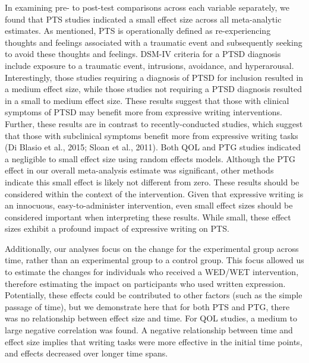 \documentclass[man, mask]{apa6}
\theoremstyle{definition}
\theoremstyle{definition}
\theoremstyle{definition}
\theoremstyle{remark}
\begin{document}
In examining pre- to post-test comparisons across each variable
separately, we found that PTS studies indicated a small effect size
across all meta-analytic estimates. As mentioned, PTS is operationally
defined as re-experiencing thoughts and feelings associated with a
traumatic event and subsequently seeking to avoid these thoughts and
feelings. DSM-IV criteria for a PTSD diagnosis include exposure to a
traumatic event, intrusions, avoidance, and hyperarousal. Interestingly,
those studies requiring a diagnosis of PTSD for inclusion resulted in a
medium effect size, while those studies not requiring a PTSD diagnosis
resulted in a small to medium effect size. These results suggest that
those with clinical symptoms of PTSD may benefit more from expressive
writing interventions. Further, these results are in contrast to
recently-conducted studies, which suggest that those with subclinical
symptoms benefit more from expressive writing tasks (Di Blasio et al.,
2015; Sloan et al., 2011). Both QOL and PTG studies indicated a
negligible to small effect size using random effects models. Although
the PTG effect in our overall meta-analysis estimate was significant,
other methods indicate this small effect is likely not different from
zero. These results should be considered within the context of the
intervention. Given that expressive writing is an innocuous,
easy-to-administer intervention, even small effect sizes should be
considered important when interpreting these results. While small, these
effect sizes exhibit a profound impact of expressive writing on PTS.

Additionally, our analyses focus on the change for the experimental
group across time, rather than an experimental group to a control group.
This focus allowed us to estimate the changes for individuals who
received a WED/WET intervention, therefore estimating the impact on
participants who used written expression. Potentially, these effects
could be contributed to other factors (such as the simple passage of
time), but we demonstrate here that for both PTS and PTG, there was no
relationship between effect size and time. For QOL studies, a medium to
large negative correlation was found. A negative relationship between
time and effect size implies that writing tasks were more effective in
the initial time points, and effects decreased over longer time spans.
\end{document}

